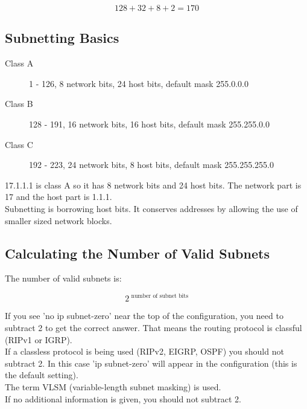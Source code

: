 \begin{equation}
128 + 32 + 8 + 2 = 170
\end{equation}

\subsection{Subnetting Basics}

\begin{description}
  
\item[Class A]
1 - 126, 8 network bits, 24 host bits, default mask 255.0.0.0
\item[Class B]
128 - 191, 16 network bits, 16 host bits, default mask 255.255.0.0
\item[Class C]
192 - 223, 24 network bits, 8 host bits, default mask 255.255.255.0

\end{description}

17.1.1.1 is class A so it has 8 network bits and 24 host bits. The network
part is 17 and the host part is 1.1.1.\\

Subnetting is borrowing host bits. It conserves addresses by allowing the
use of smaller sized network blocks.

\subsection{Calculating the Number of Valid Subnets}

The number of valid subnets is:

\begin{equation}
2 ^ {\mbox{ number of subnet bits}}
\end{equation}

If you see 'no ip subnet-zero' near the top of the configuration, you need to
subtract 2 to get the correct answer. That means the routing protocol is
classful (RIPv1 or IGRP).\\

If a classless protocol is being used (RIPv2, EIGRP, OSPF) you should not
subtract 2. In this case 'ip subnet-zero' will appear in the configuration
(this is the default setting).\\

The term VLSM (variable-length subnet masking) is used.\\

If no additional information is given, you should not subtract 2.\\

